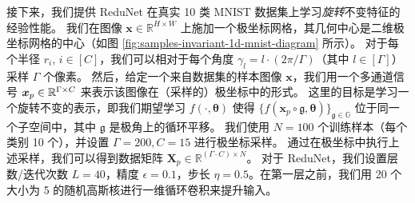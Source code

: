 \documentclass[../../book-main.tex]{subfiles}
\begin{document}
\begin{example}[数字的不变分类]
接下来，我们提供 ReduNet 在真实 10 类 MNIST 数据集上学习\textit{旋转}不变特征的经验性能。
我们在图像 $\bm{x}\in\mathbb{R}^{H\times W}$ 上施加一个极坐标网格，其几何中心是二维极坐标网格的中心（如图 \ref{fig:samples-invariant-1d-mnist-diagram} 所示）。
对于每个半径 $r_i$, $i \in [C]$，我们可以相对于每个角度 $\gamma_l =l\cdot({2\pi}/\Gamma)$（其中 $l \in [\Gamma]$）采样 $\Gamma$ 个像素。
然后，给定一个来自数据集的样本图像 $\bm{x}$，我们用一个多通道信号 $\bm{x}_p \in\mathbb{R}^{\Gamma\times C}$ 来表示该图像在（采样的）极坐标中的形式。
这里的目标是学习一个旋转不变的表示，即我们期望学习 $f(\cdot, \bm{\theta})$ 使得 $\{f(\bm{x}_p \circ \mathfrak{g}, \bm{\theta})\}_{\mathfrak{g} \in\mathbb{G}}$ 位于同一个子空间中，其中 $\mathfrak{g}$ 是极角上的循环平移。
我们使用 $N=100$ 个训练样本（每个类别 10 个），并设置 $\Gamma=200, C=15$ 进行极坐标采样。
通过在极坐标中执行上述采样，我们可以得到数据矩阵 $\bm{X}_p \in \mathbb{R}^{(\Gamma\cdot C) \times N}$。
对于 ReduNet，我们设置层数/迭代次数 $L=40$，精度 $\epsilon=0.1$，步长 $\eta=0.5$。在第一层之前，我们用 20 个大小为 5 的随机高斯核进行一维循环卷积来提升输入。


\end{example}
\end{document}
